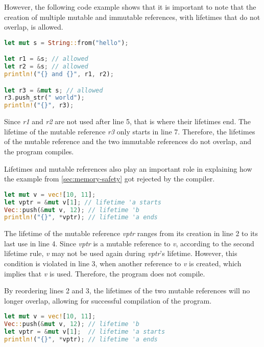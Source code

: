 \documentclass[sigplan,11pt,nonacm]{acmart}
\begin{document}
However, the following code example \cite{rust-book} shows that it is important to note that the creation of multiple mutable and immutable references, with lifetimes that do not overlap, is allowed.

\begin{lstlisting}[language=Rust]
let mut s = String::from("hello");

let r1 = &s; // allowed
let r2 = &s; // allowed
println!("{} and {}", r1, r2);

let r3 = &mut s; // allowed
r3.push_str(" world");
println!("{}", r3);
\end{lstlisting}

Since \emph{r1} and \emph{r2} are not used after line 5, that is where their lifetimes end.
The lifetime of the mutable reference \emph{r3} only starts in line 7.
Therefore, the lifetimes of the mutable reference and the two immutable references do not overlap, and the program compiles.

Lifetimes and mutable references also play an important role in explaining how the example from \ref{sec:memory-safety} got rejected by the compiler.

\begin{lstlisting}[language=Rust]
let mut v = vec![10, 11];
let vptr = &mut v[1]; // lifetime 'a starts
Vec::push(&mut v, 12); // lifetime 'b
println!("{}", *vptr); // lifetime 'a ends
\end{lstlisting}

The lifetime of the mutable reference \emph{vptr} ranges from its creation in line 2 to its last use in line 4.
Since \emph{vptr} is a mutable reference to \emph{v}, according to the second lifetime rule, \emph{v} may not be used again during \emph{vptr}'s lifetime.
However, this condition is violated in line 3, when another reference to \emph{v} is created, which implies that \emph{v} is used.
Therefore, the program does not compile.

By reordering lines 2 and 3, the lifetimes of the two mutable references will no longer overlap, allowing for successful compilation of the program.
\begin{lstlisting}[language=Rust]
let mut v = vec![10, 11];
Vec::push(&mut v, 12); // lifetime 'b
let vptr = &mut v[1];  // lifetime 'a starts
println!("{}", *vptr); // lifetime 'a ends
\end{lstlisting}


\end{document}
